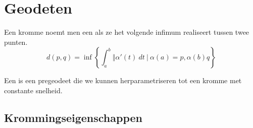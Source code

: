 \documentclass[main.tex]{subfiles}
\begin{document}
\chapter{Geodeten}
\label{cha:geodeten}

\begin{de}
  Een kromme noemt men een  als ze het volgende infimum realiseert tussen twee punten.
  \[
  d(p,q) = \inf 
  \left\{
    \int_{a}^{b}\Vert \alpha'(t)\ dt \ |\ \alpha(a) = p, \alpha(b) q
  \right\}
  \]
\end{de}

\begin{de}
  Een  is een pregeodeet die we kunnen herparametriseren tot een kromme met constante snelheid.
\end{de}

\section{Krommingseigenschappen}
\label{sec:kromm}
\end{document}
